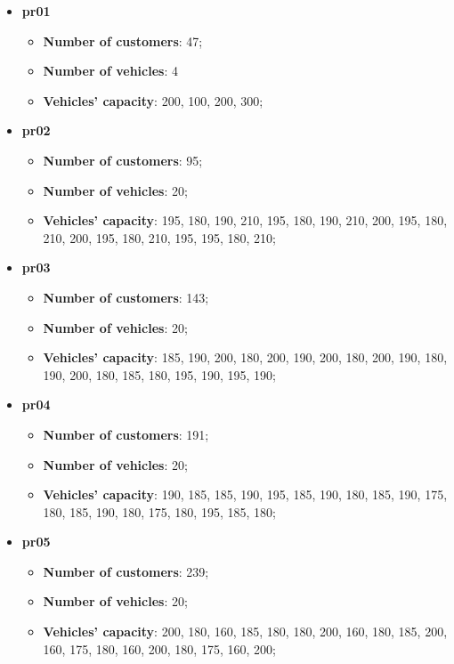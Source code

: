 \documentclass[../main.tex]{subfiles}
\begin{document}
\begin{itemize}
    \item \textbf{pr01}
        \begin{itemize}
            \item \textbf{Number of customers}: 47;
            \item \textbf{Number of vehicles}: 4
            \item \textbf{Vehicles' capacity}: 200, 100, 200, 300;
        \end{itemize}

    \item \textbf{pr02}
        \begin{itemize}
            \item \textbf{Number of customers}: 95;
            \item \textbf{Number of vehicles}: 20;
            \item \textbf{Vehicles' capacity}: 195, 180, 190, 210, 195, 180, 190, 210, 200, 195, 180, 210, 200, 195, 180, 210, 195, 195, 180, 210;
        \end{itemize}
    
    \item \textbf{pr03}
        \begin{itemize}
            \item \textbf{Number of customers}: 143;
            \item \textbf{Number of vehicles}: 20;
            \item \textbf{Vehicles' capacity}: 185, 190, 200, 180, 200, 190, 200, 180, 200, 190, 180, 190, 200, 180, 185, 180, 195, 190, 195, 190;
        \end{itemize}

    \item \textbf{pr04}
        \begin{itemize}
            \item \textbf{Number of customers}: 191;
            \item \textbf{Number of vehicles}: 20;
            \item \textbf{Vehicles' capacity}: 190, 185, 185, 190, 195, 185, 190, 180, 185, 190, 175, 180, 185, 190, 180, 175, 180, 195, 185, 180;
        \end{itemize}

    \item \textbf{pr05}
        \begin{itemize}
            \item \textbf{Number of customers}: 239;
            \item \textbf{Number of vehicles}: 20;
            \item \textbf{Vehicles' capacity}: 200, 180, 160, 185, 180, 180, 200, 160, 180, 185, 200, 160, 175, 180, 160, 200, 180, 175, 160, 200;
        \end{itemize}


\end{itemize}
\end{document}
